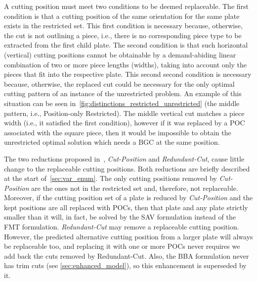 \documentclass[ppgc,tese,english,formais,babel]{iiufrgs}
\begin{document}
A cutting position must meet two conditions to be deemed replaceable.
The first condition is that a cutting position of the same orientation for the same plate exists in the restricted set.
This first condition is necessary because, otherwise, the cut is not outlining a piece, i.e., there is no corresponding piece type to be extracted from the first child plate.
The second condition is that such horizontal (vertical) cutting positions cannot be obtainable by a demand-abiding linear combination of two or more piece lengths (widths), taking into account only the pieces that fit into the respective plate.
This second second condition is necessary because, otherwise, the replaced cut could be necessary for the only optimal cutting pattern of an instance of the unrestricted problem.
An example of this situation can be seen in~\cref{fig:distinctions_restricted_unrestricted} (the middle pattern, i.e., Position-only Restricted).
The middle vertical cut matches a piece width (i.e., it satisfied the first condition), however if it was replaced by a POC associated with the square piece, then it would be impossible to obtain the unrestricted optimal solution which needs a BGC at the same position.

The two reductions proposed in~\citet{furini:2016}, \emph{Cut-Position} and \emph{Redundant-Cut}, cause little change to the replaceable cutting positions.
Both reductions are briefly described at the start of~\cref{sec:var_enum}.
The only cutting positions removed by \emph{Cut-Position} are the ones not in the restricted set and, therefore, not replaceable.
Moreover, if the cutting position set of a plate is reduced by \emph{Cut-Position} and the kept positions are all replaced with POCs, then that plate and any plate strictly smaller than it will, in fact, be solved by the SAV formulation instead of the FMT formulation.
\emph{Redundant-Cut} may remove a replaceable cutting position. However, the predicted alternative cutting position from a larger plate will always be replaceable too, and replacing it with one or more POCs never requires we add back the cuts removed by Redundant-Cut.
Also, the BBA formulation never has trim cuts (see \cref{sec:enhanced_model}), so this enhancement is superseded by it.
\end{document}
